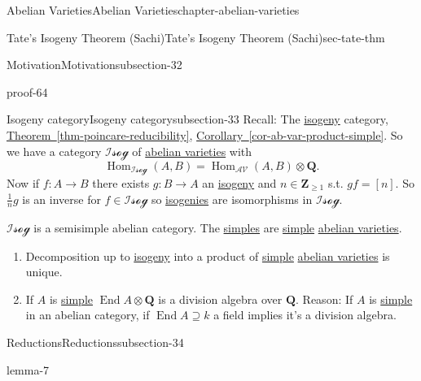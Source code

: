 \documentclass[oneside,10pt,]{book}
\numberwithin{equation}{section}
\newcommand{\lb}{[}
\newcommand{\rb}{]}
\newcommand{\ZZ}{\mathbf{Z}}
\newcommand{\QQ}{\mathbf{Q}}
\newcommand{\cat}[1]{\mathcal{#1}}
\DeclareMathOperator{\End}{End}
\DeclareMathOperator{\Hom}{Hom}
\begin{document}
\begin{chapterptx}{Abelian Varieties}{}{Abelian Varieties}{}{}{chapter-abelian-varieties}
\begin{sectionptx}{Tate's Isogeny Theorem (Sachi)}{}{Tate's Isogeny Theorem (Sachi)}{}{}{sec-tate-thm}
\begin{subsectionptx}{Motivation}{}{Motivation}{}{}{subsection-32}
\begin{proofptx}{}{proof-64}
\end{proofptx}
\end{subsectionptx}
%
%
\typeout{************************************************}
\typeout{************************************************}
%
\begin{subsectionptx}{Isogeny category}{}{Isogeny category}{}{}{subsection-33}
\hypertarget{p-383}{}%
Recall: The \hyperref[def-supersing-isog-isog]{isogeny} category, \hyperref[thm-poincare-reducibility]{Theorem~\ref{thm-poincare-reducibility}}, \hyperref[cor-ab-var-product-simple]{Corollary~\ref{cor-ab-var-product-simple}}. So we have  a category \(\cat{Isog}\) of \hyperref[def-buntes-abvar]{abelian varieties} with%
\begin{equation*}
\Hom_{\cat{Isog}}(A,B) = \Hom_\cat{AV}(A,B)\otimes \QQ\text{.}
\end{equation*}
Now if \(f \colon A \to B\) there exists \(g\colon B \to A\) an \hyperref[def-supersing-isog-isog]{isogeny} and \(n\in \ZZ_{\ge 1}\) s.t. \(gf = \lb n \rb\). So \(\frac 1n g\) is an inverse for \(f \in \cat{Isog}\) so \hyperref[def-supersing-isog-isog]{isogenies} are isomorphisms in \(\cat{Isog}\).%
\par
\hypertarget{p-384}{}%
\(\cat{Isog}\) is a semisimple abelian category. The \hyperref[def-simple-av]{simples} are \hyperref[def-simple-av]{simple} \hyperref[def-buntes-abvar]{abelian varieties}.\leavevmode%
\begin{enumerate}
\item\hypertarget{li-71}{}Decomposition up to \hyperref[def-supersing-isog-isog]{isogeny} into a product of \hyperref[def-simple-av]{simple} \hyperref[def-buntes-abvar]{abelian varieties} is unique.%
\item\hypertarget{li-72}{}If \(A\) is \hyperref[def-simple-av]{simple} \(\End A \otimes \QQ\) is a division algebra over \(\QQ\). Reason: If \(A\) is \hyperref[def-simple-av]{simple} in an abelian category, if \(\End A \supseteq k\) a field implies it's a division algebra.%
\end{enumerate}
%
\end{subsectionptx}
%
%
\typeout{************************************************}
\typeout{************************************************}
%
\begin{subsectionptx}{Reductions}{}{Reductions}{}{}{subsection-34}
\begin{lemma}{}{}{lemma-7}%
\hypertarget{p-385}{}%
\leavevmode%
\begin{enumerate}

\end{enumerate}
\end{lemma}
\end{subsectionptx}
\end{sectionptx}
\end{chapterptx}
\end{document}
